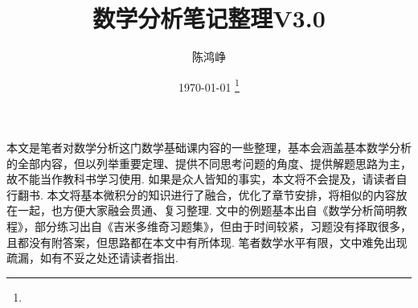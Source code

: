 \documentclass[11pt,UTF8]{ctexart}
\title{数学分析笔记整理V3.0}
\author{陈鸿峥}
\date{{\builddatemonth\today} \footnote{\text{Build \builddate\today}}}%
\renewcommand{\thefootnote}{\fnsymbol{footnote}}
\begin{document}
\maketitle
\renewcommand{\thefootnote}{\arabic{footnote}}
\setcounter{footnote}{0}

\setcounter{tocdepth}{2}%
\tableofcontents
\bigskip\bigskip\bigskip

\par 本文是笔者对数学分析这门数学基础课内容的一些整理，基本会涵盖基本数学分析的全部内容，但以列举重要定理、提供不同思考问题的角度、提供解题思路为主，故不能当作教科书学习使用. 如果是众人皆知的事实，本文将不会提及，请读者自行翻书. 本文将基本微积分的知识进行了融合，优化了章节安排，将相似的内容放在一起，也方便大家融会贯通、复习整理. 文中的例题基本出自《数学分析简明教程》，部分练习出自《吉米多维奇习题集》，但由于时间较紧，习题没有择取很多，且都没有附答案，但思路都在本文中有所体现. 笔者数学水平有限，文中难免出现疏漏，如有不妥之处还请读者指出. 













\end{document}
